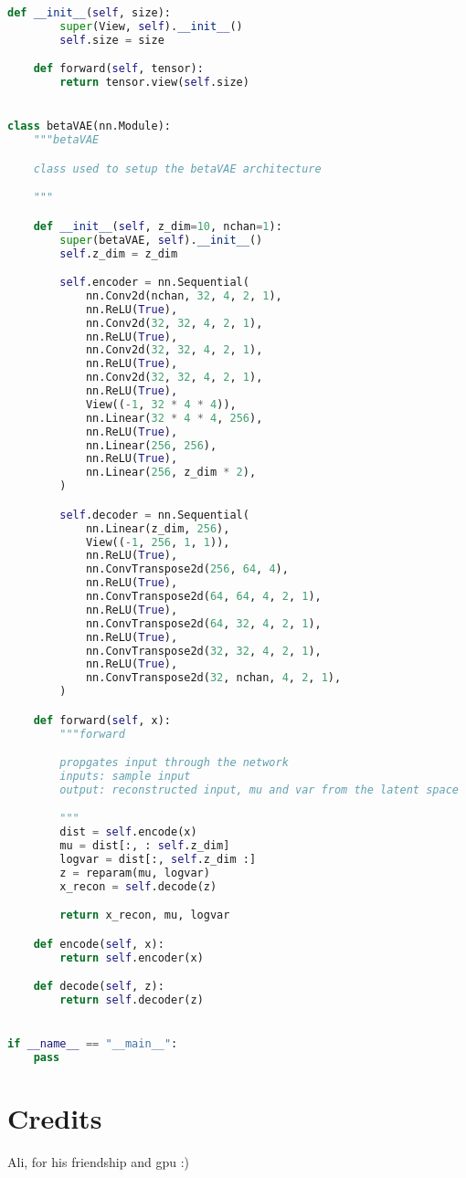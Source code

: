 \documentclass[justified,nobib]{tufte-handout}
\begin{document}
\begin{fullwidth}
\begin{lstlisting}[language=Python]
    def __init__(self, size):
        super(View, self).__init__()
        self.size = size

    def forward(self, tensor):
        return tensor.view(self.size)


class betaVAE(nn.Module):
    """betaVAE

    class used to setup the betaVAE architecture 

    """

    def __init__(self, z_dim=10, nchan=1):
        super(betaVAE, self).__init__()
        self.z_dim = z_dim

        self.encoder = nn.Sequential(
            nn.Conv2d(nchan, 32, 4, 2, 1),
            nn.ReLU(True),
            nn.Conv2d(32, 32, 4, 2, 1),
            nn.ReLU(True),
            nn.Conv2d(32, 32, 4, 2, 1),
            nn.ReLU(True),
            nn.Conv2d(32, 32, 4, 2, 1),
            nn.ReLU(True),
            View((-1, 32 * 4 * 4)),
            nn.Linear(32 * 4 * 4, 256),
            nn.ReLU(True),
            nn.Linear(256, 256),
            nn.ReLU(True),
            nn.Linear(256, z_dim * 2),
        )

        self.decoder = nn.Sequential(
            nn.Linear(z_dim, 256),
            View((-1, 256, 1, 1)),
            nn.ReLU(True),
            nn.ConvTranspose2d(256, 64, 4),
            nn.ReLU(True),
            nn.ConvTranspose2d(64, 64, 4, 2, 1),
            nn.ReLU(True),
            nn.ConvTranspose2d(64, 32, 4, 2, 1),
            nn.ReLU(True),
            nn.ConvTranspose2d(32, 32, 4, 2, 1),
            nn.ReLU(True),
            nn.ConvTranspose2d(32, nchan, 4, 2, 1),
        )

    def forward(self, x):
        """forward

        propgates input through the network
        inputs: sample input
        output: reconstructed input, mu and var from the latent space

        """
        dist = self.encode(x)
        mu = dist[:, : self.z_dim]
        logvar = dist[:, self.z_dim :]
        z = reparam(mu, logvar)
        x_recon = self.decode(z)

        return x_recon, mu, logvar

    def encode(self, x):
        return self.encoder(x)

    def decode(self, z):
        return self.decoder(z)


if __name__ == "__main__":
    pass


\end{lstlisting}
\clearpage
{}

\section{Credits}
Ali, for his friendship and gpu :)
\clearpage
\end{fullwidth}
\end{document}
